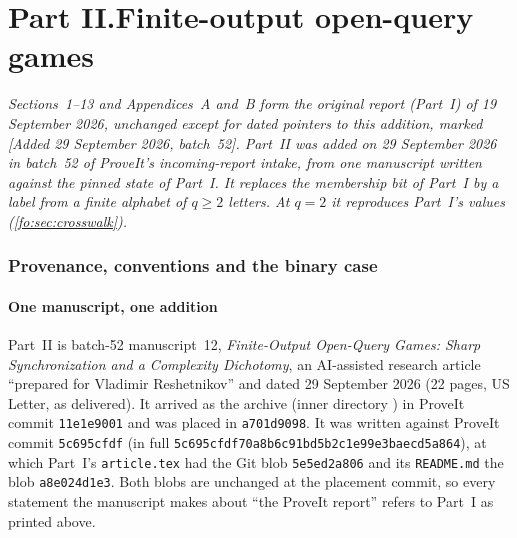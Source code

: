 \documentclass[11pt,letterpaper]{article}
\numberwithin{equation}{section}
\theoremstyle{definition}
\theoremstyle{remark}
\theoremstyle{definition}
\begin{document}
\clearpage
{}\part*{Part II.\quad Finite-output open-query games}

\noindent\emph{Sections~1--13 and Appendices~A and~B form the
original report (Part~I) of 19 September 2026, unchanged except for dated
pointers to this addition, marked \textup{[Added 29 September 2026,
batch~52]}. Part~II was added on 29 September 2026 in batch~52 of ProveIt's
incoming-report intake, from one manuscript written against the pinned state
of Part~I. It replaces the membership bit of Part~I by a label from a finite
alphabet of $q\ge2$ letters. At $q=2$ it reproduces Part~I's values
(\cref{fo:sec:crosswalk}).}

\section{Provenance, conventions and the binary case}
\label{fo:sec:provenance}

\subsection{One manuscript, one addition}
\label{fo:sec:source}
Part~II is batch-52 manuscript~12, \emph{Finite-Output Open-Query Games: Sharp
Synchronization and a Complexity Dichotomy}, an AI-assisted research article
``prepared for Vladimir Reshetnikov'' and dated 29 September 2026 (22 pages,
US Letter, as delivered). It arrived as the archive
 (inner directory
) in ProveIt commit
\texttt{11e1e9001} and was placed in \texttt{a701d9098}. It was written against
ProveIt commit \texttt{5c695cfdf} (in full
\texttt{5c695cfdf70a8b6c91bd5b2c1e99e3baecd5a864}), at which Part~I's
\texttt{article.tex} had the Git blob \texttt{5e5ed2a806} and its
\texttt{README.md} the blob \texttt{a8e024d1e3}. Both blobs are unchanged at the
placement commit, so every statement the manuscript makes about ``the ProveIt
report'' \cite{Repo} refers to Part~I as printed above.
\end{document}
